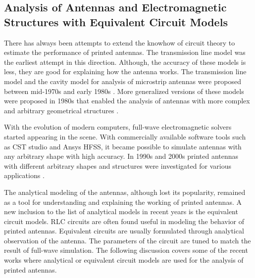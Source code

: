 \subsection{Analysis of Antennas and Electromagnetic Structures with Equivalent Circuit Models}
There has always been attempts to extend the knowhow of circuit theory to estimate the performance of printed antennas. The transmission line model was the earliest attempt in this direction. Although, the accuracy of these models is less, they are good for explaining how the antenna works. The transmission line model and the cavity model for analysis of microstrip antennas were proposed between mid-1970s and early 1980s \cite{txmPhasedArray, txmLinP, txmRect, txmMc, txmLossy, txmPMA, txm_opt, txm_wideband}. More generalized versions of these models were proposed in 1980s that enabled the analysis of antennas with more complex and arbitrary geometrical structures \cite{gtlmThesis, gtlmMath, gtlm2, gtlmAnnular, gtlmSectorCirc, gtlmAnnuRing, gtlmElliptRing}.

With the evolution of modern computers, full-wave electromagnetic solvers started appearing in the scene. With commercially available software tools such as CST studio{\circledR} and Ansys HFSS{\circledR}, it became possible to simulate antennas with any arbitrary shape with high accuracy. In 1990s and 2000s printed antennas with different arbitrary shapes and structures were investigated for various applications \cite{smallPatch0, BandSize0, HPatch1, uslot1, dualBandCircPol, dualBandWLAN, fractal1, slottedUWB, bandnotchCSRR1, bandnotchEBG1, SlottedPatchModel, spiralSlotGnd, GndSRRPatch}.

The analytical modeling of the antennas, although lost its popularity, remained as a tool for understanding and explaining the working of printed antennas. A new inclusion to the list of analytical models in recent years is the equivalent circuit models. RLC circuits are often found useful in modeling the behavior of printed antennas. Equivalent circuits are usually formulated through analytical observation of the antenna. The parameters of the circuit are tuned to match the result of full-wave simulation. The following discussion covers some of the recent works where analytical or equivalent circuit models are used for the analysis of printed antennas.

